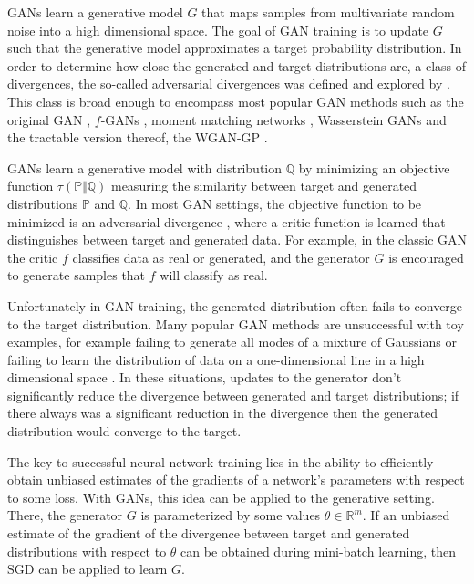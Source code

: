\documentclass{article}
\begin{document}
 GANs learn a generative model $G$ that maps samples from multivariate random noise into a high dimensional space.
 The goal of GAN training is to update $G$ such that the generative model approximates a target probability distribution.
 In order to determine how close the generated and target distributions are, a class of divergences, the so-called adversarial
 divergences was defined and explored by \cite{liu2017approximation}. This class is broad enough to encompass most popular GAN methods
 such as the original GAN \cite{goodfellow2014generative}, $f$-GANs \cite{nowozin2016f}, moment matching networks \cite{li2015generative},
 Wasserstein GANs \cite{arjovsky2017wasserstein} and the tractable version thereof, the WGAN-GP \cite{gulrajani2017improved}.

 GANs learn a generative model with distribution $\mathbb Q$ by minimizing an objective function
 $\tau(\mathbb P\Vert\mathbb Q)$ measuring the similarity between target and generated distributions $\mathbb P$ and $\mathbb Q$.
 In most GAN settings, the objective function to be minimized is an adversarial divergence \cite{liu2017approximation}, where a critic function is learned
 that distinguishes between target and generated data.
 For example, in the classic GAN \cite{goodfellow2014generative}
 the critic $f$ classifies data as real or generated, and the generator $G$ is encouraged
 to generate samples that $f$ will classify as real.

 Unfortunately in GAN training, the generated distribution often fails to converge to the target distribution.
 Many popular GAN methods are unsuccessful with toy examples, for example failing to generate all modes of a
 mixture of Gaussians \cite{srivastava2017veegan,metz2016unrolled}
 or failing to learn the distribution of data on a one-dimensional line in a high dimensional space \cite{fedus2017many}.
 In these situations, updates to the generator don't significantly reduce the divergence between generated and target distributions;
 if there always was a significant reduction in the divergence then the generated distribution would converge to the target.

 The key to successful neural network training lies in the ability to efficiently obtain unbiased estimates of the gradients of a network's
 parameters with respect to some loss.
 With GANs, this idea can be applied to the generative setting. There, the generator $G$ is parameterized by some
 values $\theta\in\mathbb R^m$. If an unbiased estimate of the gradient of the divergence between target and generated distributions
 with respect to $\theta$ can be obtained during mini-batch learning, then SGD can be applied to learn $G$.
\end{document}
